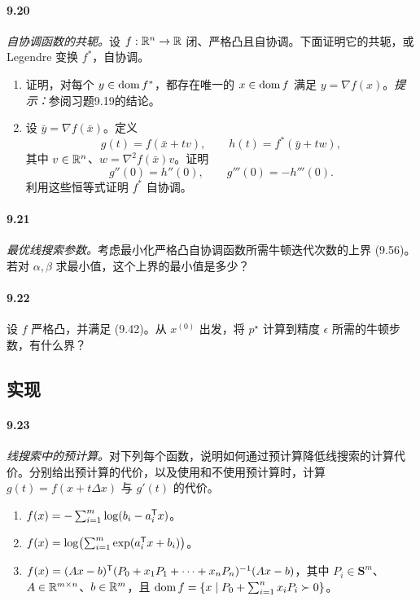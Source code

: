 \paragraph{9.20} \emph{自协调函数的共轭。}设 $f:\mathbb R^n\to\mathbb R$ 闭、严格凸且自协调。下面证明它的共轭，或 Legendre 变换 $f^*$，自协调。
\begin{enumerate}[label=(\alph*)]
\item 证明，对每个 $y\in\operatorname{dom} f^*$，都存在唯一的 $x\in\operatorname{dom} f$ 满足 $y=\nabla f(x)$。\emph{提示：}参阅习题9.19的结论。
\item 设 $\bar y=\nabla f(\bar x)$。定义
\[
 g(t)=f(\bar x+tv),\qquad h(t)=f^*(\bar y+tw),
\]
其中 $v\in\mathbb R^n$、$w=\nabla^2f(\bar x)v$。证明
\[
 g''(0)=h''(0),\qquad g'''(0)=-h'''(0).
\]
利用这些恒等式证明 $f^*$ 自协调。
\end{enumerate}

\paragraph{9.21} \emph{最优线搜索参数。}考虑最小化严格凸自协调函数所需牛顿迭代次数的上界 (9.56)。若对 $\alpha,\beta$ 求最小值，这个上界的最小值是多少？

\paragraph{9.22} 设 $f$ 严格凸，并满足 (9.42)。从 $x^{(0)}$ 出发，将 $p^\star$ 计算到精度 $\epsilon$ 所需的牛顿步数，有什么界？

\subsection*{实现}
\paragraph{9.23} \emph{线搜索中的预计算。}对下列每个函数，说明如何通过预计算降低线搜索的计算代价。分别给出预计算的代价，以及使用和不使用预计算时，计算 $g(t)=f(x+t\Delta x)$ 与 $g'(t)$ 的代价。
\begin{enumerate}[label=(\alph*)]
\item $f(x)=-\sum_{i=1}^m\log(b_i-a_i^\mathsf T x)$。
\item $f(x)=\log\bigl(\sum_{i=1}^m\exp(a_i^\mathsf T x+b_i)\bigr)$。
\item $f(x)=(Ax-b)^\mathsf T(P_0+x_1P_1+\cdots+x_nP_n)^{-1}(Ax-b)$，其中 $P_i\in\mathbf S^m$、$A\in\mathbb R^{m\times n}$、$b\in\mathbb R^m$，且 $\operatorname{dom} f=\{x\mid P_0+\sum_{i=1}^n x_iP_i\succ0\}$。
\end{enumerate}

